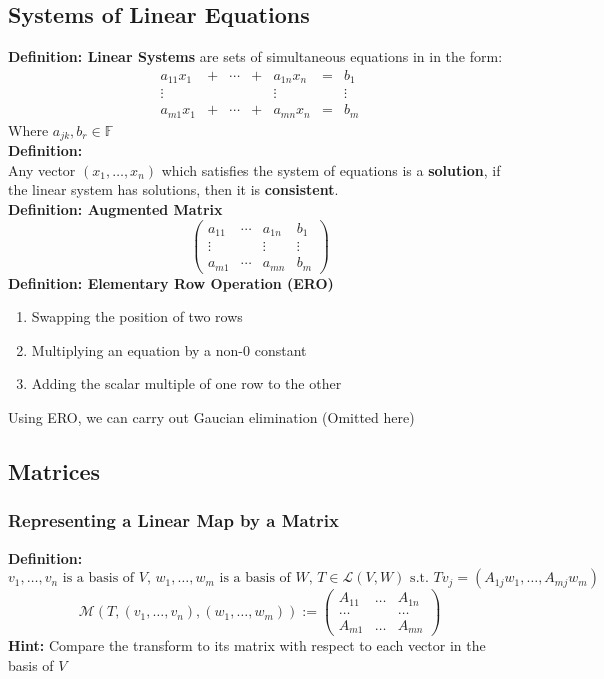 \documentclass{article}
\newcommand{\F}{\mathbb{F}}
\newcommand{\st}{\mbox{ s.t. }}
\newcommand{\0}{{\bf{0}}}
\begin{document}
\subsection{Systems of Linear Equations}
\textbf{Definition: Linear Systems} are sets of simultaneous equations in in the form:
$$\begin{matrix}
    a_{11}x_1&+&\cdots&+&a_{1n}x_n&=&b_1\\
    \vdots&&&&\vdots&&\vdots\\
    a_{m1}x_1&+&\cdots&+&a_{mn}x_n&=&b_m
\end{matrix}$$
Where $a_{jk},b_r\in\F$\\
\textbf{Definition:}\\
Any vector $(x_1,\dots,x_n)$ which satisfies the system of equations is a \textbf{solution}, if the linear system has solutions, then it is \textbf{consistent}.\\
\textbf{Definition: Augmented Matrix}
$$\left(\begin{array}{ccc|c}
    a_{11}&\cdots&a_{1n}&b_1\\
    \vdots&&\vdots&\vdots\\
    a_{m1}&\cdots&a_{mn}&b_m
\end{array}\right)$$
\textbf{Definition: Elementary Row Operation (ERO)}
\begin{enumerate}
    \item Swapping the position of two rows
    \item Multiplying an equation by a non-0 constant
    \item Adding the scalar multiple of one row to the other
\end{enumerate}
Using ERO, we can carry out Gaucian elimination (Omitted here)
\subsection{Matrices}
\subsubsection{Representing a Linear Map by a Matrix}
\textbf{Definition:}
$$v_1,\dots,v_n\mbox{ is a basis of }V,\,w_1,\dots,w_m\mbox{ is a basis of }W,\,T\in\mathcal{L}(V,W)\st Tv_{j}=(A_{1j}w_1,\dots,A_{mj}w_m)$$
$$\mathcal{M}(T,(v_1,\dots,v_n),(w_1,\dots,w_m)):=\begin{pmatrix}
    A_{11}&\dots&A_{1n}\\
    \dots&&\dots\\
    A_{m1}&\dots&A_{mn}
\end{pmatrix}$$
\textbf{Hint:} Compare the transform to its matrix with respect to each vector in the basis of $V$
\end{document}
